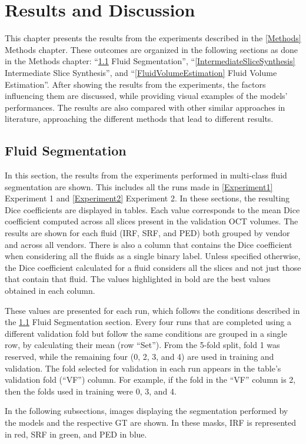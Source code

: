 \chapter{Results and Discussion}\label{ResultsDiscussion}

This chapter presents the results from the experiments described in the \ref{Methods} Methods chapter. These outcomes are organized in the following sections as done in the Methods chapter: ``\ref{FluidSegmentation} Fluid Segmentation'', ``\ref{IntermediateSliceSynthesis} Intermediate Slice Synthesis'', and ``\ref{FluidVolumeEstimation} Fluid Volume Estimation''. After showing the results from the experiments, the factors influencing them are discussed, while providing visual examples of the models' performances. The results are also compared with other similar approaches in literature, approaching the different methods that lead to different results.

\section{Fluid Segmentation}\label{FluidSegmentation}
In this section, the results from the experiments performed in multi-class fluid segmentation are shown. This includes all the runs made in \ref{Experiment1} Experiment 1 and \ref{Experiment2} Experiment 2. In these sections, the resulting Dice coefficients are displayed in tables. Each value corresponds to the mean Dice coefficient computed across all slices present in the validation OCT volumes. The results are shown for each fluid (IRF, SRF, and PED) both grouped by vendor and across all vendors. There is also a column that contains the Dice coefficient when considering all the fluids as a single binary label. Unless specified otherwise, the Dice coefficient calculated for a fluid considers all the slices and not just those that contain that fluid. The values highlighted in bold are the best values obtained in each column. 
\par
These values are presented for each run, which follows the conditions described in the \ref{FluidSegmentation} Fluid Segmentation section. Every four runs that are completed using a different validation fold but follow the same conditions are grouped in a single row, by calculating their mean (row ``Set''). From the 5-fold split, fold 1 was reserved, while the remaining four (0, 2, 3, and 4) are used in training and validation. The fold selected for validation in each run appears in the table's validation fold (``VF'') column. For example, if the fold in the ``VF'' column is 2, then the folds used in training were 0, 3, and 4.
\par
In the following subsections, images displaying the segmentation performed by the models and the respective GT are shown. In these masks, IRF is represented in red, SRF in green, and PED in blue.

